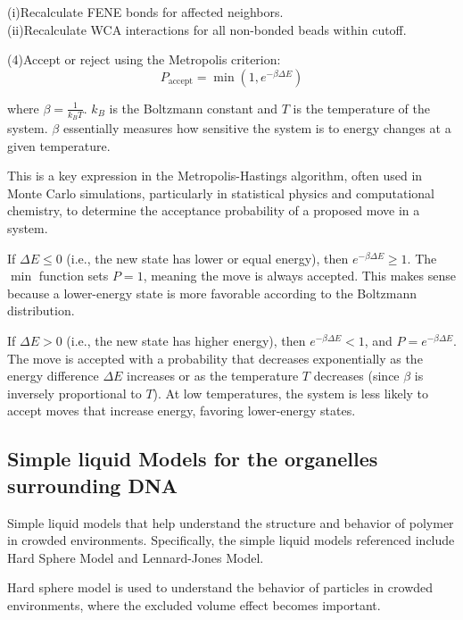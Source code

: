 \documentclass[12pt]{article}
\begin{document}
\begin{flushleft}
\setlength{\parindent}{100pt}(i)Recalculate FENE bonds for affected neighbors.\\
(ii)Recalculate WCA interactions for all non-bonded beads within cutoff.\\
\setlength{\parindent}{0pt}


\setlength{\parindent}{6em}(4)Accept or reject using the Metropolis criterion:
\setlength{\parindent}{0pt}
\begin{equation}
P_{\text{accept}} = \min \left(1, e^{-\beta \Delta E}\right)
\end{equation}

where $\beta = \frac{1}{k_B T}$. $k_B$ is the Boltzmann constant and $T$ is the temperature of the system. $\beta$ essentially measures how sensitive the system is to energy changes at a given temperature.

\setlength{\parindent}{45pt}

This is a key expression in the Metropolis-Hastings algorithm, often used in Monte Carlo simulations, particularly in statistical physics and computational chemistry, to determine the acceptance probability of a proposed move in a system.




If $\Delta E \leq 0$ (i.e., the new state has lower or equal energy), then $e^{-\beta \Delta E} \geq 1$. The $\min$ function sets $P = 1$, meaning the move is always accepted. This makes sense because a lower-energy state is more favorable according to the Boltzmann distribution.

If $\Delta E > 0$ (i.e., the new state has higher energy), then $e^{-\beta \Delta E} < 1$, and $P = e^{-\beta \Delta E}$. The move is accepted with a probability that decreases exponentially as the energy difference $\Delta E$ increases or as the temperature $T$ decreases (since $\beta$ is inversely proportional to $T$). At low temperatures, the system is less likely to accept moves that increase energy, favoring lower-energy states.


\subsection*{Simple liquid Models for the organelles surrounding DNA}

Simple liquid models that help understand the structure and behavior of polymer in crowded environments. Specifically, the simple liquid models referenced include Hard Sphere Model and Lennard-Jones Model. 

Hard sphere model is used to understand the behavior of particles in crowded environments, where the excluded volume effect becomes important. 


\end{flushleft}
\end{document}
